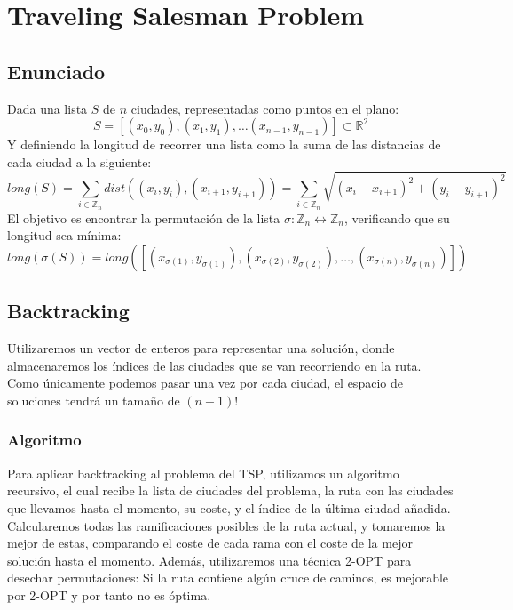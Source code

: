 \documentclass[a4paper, 11pt]{article} %
\begin{document}
\section{Traveling Salesman Problem}
  \subsection{Enunciado}
    Dada una lista $S$ de $n$ ciudades, representadas como puntos en el plano:
    \begin{equation}
      S = [(x_0,y_0), (x_1,y_1), \dots (x_{n-1},y_{n-1})] \subset \mathbb{R}^2
    \end{equation}
    Y definiendo la longitud de recorrer una lista como la suma de las distancias de cada ciudad a la siguiente:
    \begin{equation}
     long(S) = \sum_{i \in \mathbb{Z}_n} dist((x_i,y_i), (x_{i+1}, y_{i+1})) = \sum_{i \in \mathbb{Z}_n} \sqrt{(x_i-x_{i+1})^2 + (y_i-y_{i+1})^2}
    \end{equation}
    El objetivo es encontrar la permutación de la lista $\sigma : \mathbb{Z}_n \leftrightarrow \mathbb{Z}_n$, verificando que su longitud sea mínima:
    \begin{equation}
     long(\sigma(S)) = long([(x_{\sigma(1)},y_{\sigma(1)}), (x_{\sigma(2)},y_{\sigma(2)}), \dots, (x_{\sigma(n)},y_{\sigma(n)})])
    \end{equation}
    
  \subsection{Backtracking}
  
  
  Utilizaremos un vector de enteros para representar una solución, donde almacenaremos los índices de las ciudades que se van recorriendo en la ruta. Como únicamente podemos pasar una vez por cada ciudad, el espacio de soluciones tendrá un tamaño de $(n-1)!$
  
  
    \subsubsection{Algoritmo}
      Para aplicar backtracking al problema del TSP, utilizamos un algoritmo recursivo, el cual recibe la lista de 
      ciudades del problema, la ruta con las ciudades que llevamos hasta el momento, su coste, y el índice de la 
      última ciudad añadida. Calcularemos todas las ramificaciones posibles de la ruta actual, y tomaremos la mejor 
      de estas, comparando el coste de cada rama con el coste de la mejor solución hasta el momento. Además, 
      utilizaremos una técnica 2-OPT para desechar permutaciones: Si la ruta contiene algún cruce de caminos, es 
      mejorable por 2-OPT y por tanto no es óptima. 
  
\end{document}
